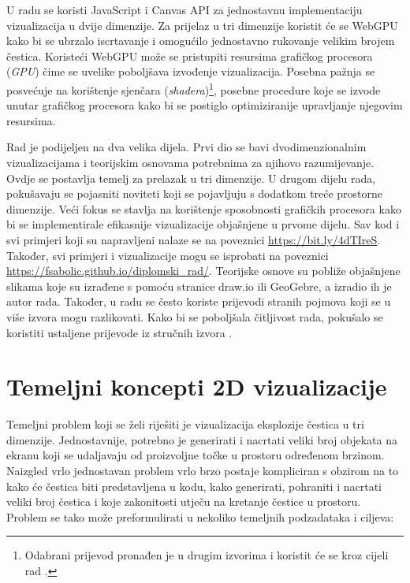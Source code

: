 \documentclass{foi}
\begin{document}
U radu se koristi JavaScript i Canvas API za jednostavnu implementaciju vizualizacija u dvije dimenzije. Za prijelaz u tri dimenzije koristit će se WebGPU kako bi se ubrzalo iscrtavanje i omogućilo jednostavno rukovanje velikim brojem čestica. Koristeći WebGPU može se pristupiti resursima grafičkog procesora (\textit{GPU}) čime se uvelike poboljšava izvođenje vizualizacija. Posebna pažnja se posvećuje na korištenje sjenčara (\textit{shadera})\footnote{Odabrani prijevod pronađen je u drugim izvorima i koristit će se kroz cijeli rad \parencite{InteraktivnaRacunarnaGrafika2021}.}, posebne procedure koje se izvode unutar grafičkog procesora kako bi se postiglo optimiziranije upravljanje njegovim resursima. 

Rad je podijeljen na dva velika dijela. Prvi dio se bavi dvodimenzionalnim vizualizacijama i teorijskim osnovama potrebnima za njihovo razumijevanje. Ovdje se postavlja temelj za prelazak u tri dimenzije. U drugom dijelu rada, pokušavaju se pojasniti noviteti koji se pojavljuju s dodatkom treće prostorne dimenzije. Veći fokus se stavlja na korištenje sposobnosti grafičkih procesora kako bi se implementirale efikasnije vizualizacije objašnjene u prvome dijelu. Sav kod i svi primjeri koji su napravljeni nalaze se na poveznici \url{https://bit.ly/4dTIreS}. Također, svi primjeri i vizualizacije mogu se isprobati na poveznici \url{https://fsabolic.github.io/diplomski_rad/}. Teorijske osnove su pobliže objašnjene slikama koje su izrađene s pomoću stranice draw.io ili GeoGebre, a izradio ih je autor rada. Također, u radu se često koriste prijevodi stranih pojmova koji se u više izvora mogu razlikovati. Kako bi se poboljšala čitljivost rada, pokušalo se koristiti ustaljene prijevode iz stručnih izvora \parencite{VirtualnaOkruzenja2011}.




\chapter{Temeljni koncepti 2D vizualizacije}

Temeljni problem koji se želi riješiti je vizualizacija eksplozije čestica u tri dimenzije. Jednostavnije, potrebno je generirati i nacrtati veliki broj objekata na ekranu koji se udaljavaju od proizvoljne točke u prostoru određenom brzinom. Naizgled vrlo jednostavan problem vrlo brzo postaje kompliciran s obzirom na to kako će čestica biti predstavljena u kodu, kako generirati, pohraniti i nacrtati veliki broj čestica i koje zakonitosti utječu na kretanje čestice u prostoru. Problem se tako može preformulirati u nekoliko temeljnih podzadataka i ciljeva:
\end{document}
